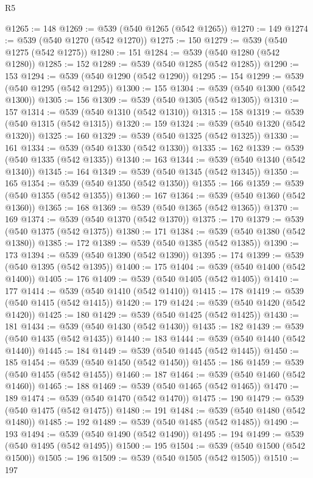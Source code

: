 \begin{lexlean}{R5}
\begin{coremodule}
@1265 := 148
@1269 := @539 (@540 @1265 (@542 @1265))
@1270 := 149
@1274 := @539 (@540 @1270 (@542 @1270))
@1275 := 150
@1279 := @539 (@540 @1275 (@542 @1275))
@1280 := 151
@1284 := @539 (@540 @1280 (@542 @1280))
@1285 := 152
@1289 := @539 (@540 @1285 (@542 @1285))
@1290 := 153
@1294 := @539 (@540 @1290 (@542 @1290))
@1295 := 154
@1299 := @539 (@540 @1295 (@542 @1295))
@1300 := 155
@1304 := @539 (@540 @1300 (@542 @1300))
@1305 := 156
@1309 := @539 (@540 @1305 (@542 @1305))
@1310 := 157
@1314 := @539 (@540 @1310 (@542 @1310))
@1315 := 158
@1319 := @539 (@540 @1315 (@542 @1315))
@1320 := 159
@1324 := @539 (@540 @1320 (@542 @1320))
@1325 := 160
@1329 := @539 (@540 @1325 (@542 @1325))
@1330 := 161
@1334 := @539 (@540 @1330 (@542 @1330))
@1335 := 162
@1339 := @539 (@540 @1335 (@542 @1335))
@1340 := 163
@1344 := @539 (@540 @1340 (@542 @1340))
@1345 := 164
@1349 := @539 (@540 @1345 (@542 @1345))
@1350 := 165
@1354 := @539 (@540 @1350 (@542 @1350))
@1355 := 166
@1359 := @539 (@540 @1355 (@542 @1355))
@1360 := 167
@1364 := @539 (@540 @1360 (@542 @1360))
@1365 := 168
@1369 := @539 (@540 @1365 (@542 @1365))
@1370 := 169
@1374 := @539 (@540 @1370 (@542 @1370))
@1375 := 170
@1379 := @539 (@540 @1375 (@542 @1375))
@1380 := 171
@1384 := @539 (@540 @1380 (@542 @1380))
@1385 := 172
@1389 := @539 (@540 @1385 (@542 @1385))
@1390 := 173
@1394 := @539 (@540 @1390 (@542 @1390))
@1395 := 174
@1399 := @539 (@540 @1395 (@542 @1395))
@1400 := 175
@1404 := @539 (@540 @1400 (@542 @1400))
@1405 := 176
@1409 := @539 (@540 @1405 (@542 @1405))
@1410 := 177
@1414 := @539 (@540 @1410 (@542 @1410))
@1415 := 178
@1419 := @539 (@540 @1415 (@542 @1415))
@1420 := 179
@1424 := @539 (@540 @1420 (@542 @1420))
@1425 := 180
@1429 := @539 (@540 @1425 (@542 @1425))
@1430 := 181
@1434 := @539 (@540 @1430 (@542 @1430))
@1435 := 182
@1439 := @539 (@540 @1435 (@542 @1435))
@1440 := 183
@1444 := @539 (@540 @1440 (@542 @1440))
@1445 := 184
@1449 := @539 (@540 @1445 (@542 @1445))
@1450 := 185
@1454 := @539 (@540 @1450 (@542 @1450))
@1455 := 186
@1459 := @539 (@540 @1455 (@542 @1455))
@1460 := 187
@1464 := @539 (@540 @1460 (@542 @1460))
@1465 := 188
@1469 := @539 (@540 @1465 (@542 @1465))
@1470 := 189
@1474 := @539 (@540 @1470 (@542 @1470))
@1475 := 190
@1479 := @539 (@540 @1475 (@542 @1475))
@1480 := 191
@1484 := @539 (@540 @1480 (@542 @1480))
@1485 := 192
@1489 := @539 (@540 @1485 (@542 @1485))
@1490 := 193
@1494 := @539 (@540 @1490 (@542 @1490))
@1495 := 194
@1499 := @539 (@540 @1495 (@542 @1495))
@1500 := 195
@1504 := @539 (@540 @1500 (@542 @1500))
@1505 := 196
@1509 := @539 (@540 @1505 (@542 @1505))
@1510 := 197

\end{coremodule}
\end{lexlean}
